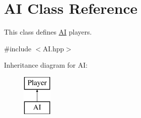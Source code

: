 \hypertarget{classAI}{\section{A\-I Class Reference}
\label{classAI}
}


This class defines \hyperlink{classAI}{A\-I} players.  




{\ttfamily \#include $<$A\-I.\-hpp$>$}

Inheritance diagram for A\-I\-:\begin{figure}[H]
\begin{center}
\leavevmode
\includegraphics[height=2.000000cm]{classAI}
\end{center}
\end{figure}
